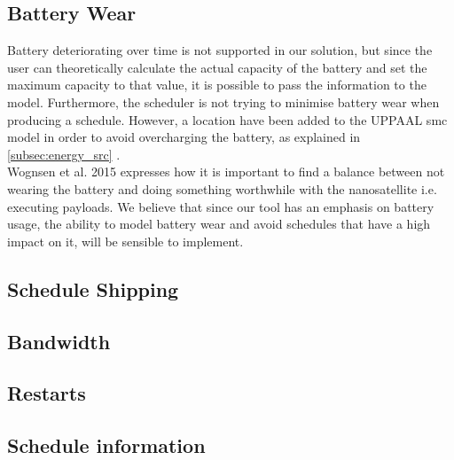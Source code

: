 \subsection{Battery Wear}
Battery deteriorating over time is not supported in our solution, but since the user can theoretically calculate the actual capacity of the battery and set the maximum capacity to that value, it is possible to pass the information to the model. Furthermore, the scheduler is not trying to minimise battery wear when producing a schedule. However, a location have been added to the UPPAAL \gls{smc} model in order to avoid overcharging the battery, as explained in \ref{subsec:energy_src} .\\
Wognsen et al. 2015\cite{score_function} expresses how it is important to find a balance between not wearing the battery and doing something worthwhile with the nanosatellite i.e. executing payloads. We believe that since our tool has an emphasis on battery usage, the ability to model battery wear and avoid schedules that have a high impact on it, will be sensible to implement. 

\subsection{Schedule Shipping}

\subsection{Bandwidth}


\subsection{Restarts}

\subsection{Schedule information}
